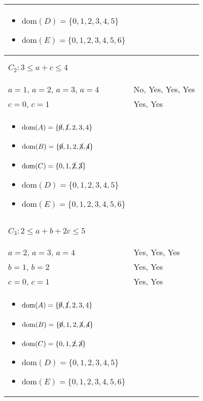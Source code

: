 \begin{example}
\begin{center}
\begin{tabular}{ll}
{\begin{itemize}
                \item $\text{dom}(D) = \{0, 1, 2, 3, 4, 5\} $
                \item $\text{dom}(E) = \{0, 1, 2, 3, 4, 5, 6\} $
            \end{itemize}} \\
            \midrule
            \multicolumn{2}{p{\linewidth}}{
            \begin{center}
                $C_2: 3 \leq a + c \leq 4$
            \end{center}} \\
            \midrule
                $a=1$, $a=2$, $a=3$, $a=4$ & No, Yes, Yes, Yes \\
                $c=0$, $c=1$ & Yes, Yes \\
            \multicolumn{2}{p{\linewidth}}{
            \begin{itemize}
                \item $\text{dom}(A) = \{\cancel{0}, \cancel{1}, 2, 3, 4\}$
                \item $\text{dom}(B) = \{\cancel{0}, 1, 2, \cancel{3}, \cancel{4}\} $
                \item $\text{dom}(C) = \{0, 1, \cancel{2}, \cancel{3}\} $
                \item $\text{dom}(D) = \{0, 1, 2, 3, 4, 5\} $
                \item $\text{dom}(E) = \{0, 1, 2, 3, 4, 5, 6\} $
            \end{itemize}} \\
            \midrule
            \multicolumn{2}{p{\linewidth}}{
            \begin{center}
                $C_3: 2 \leq a + b + 2c \leq 5$
            \end{center}} \\
            \midrule
                $a=2$, $a=3$, $a=4$ & Yes, Yes, Yes \\
                $b=1$, $b=2$ & Yes, Yes \\
                $c=0$, $c=1$ & Yes, Yes \\
            \multicolumn{2}{p{\linewidth}}{
            \begin{itemize}
                \item $\text{dom}(A) = \{\cancel{0}, \cancel{1}, 2, 3, 4\}$
                \item $\text{dom}(B) = \{\cancel{0}, 1, 2, \cancel{3}, \cancel{4}\} $
                \item $\text{dom}(C) = \{0, 1, \cancel{2}, \cancel{3}\} $
                \item $\text{dom}(D) = \{0, 1, 2, 3, 4, 5\} $
                \item $\text{dom}(E) = \{0, 1, 2, 3, 4, 5, 6\} $
            \end{itemize}} \\
            \bottomrule
        \end{tabular}
    \end{center}
    \vspace{1em}


\end{example}
